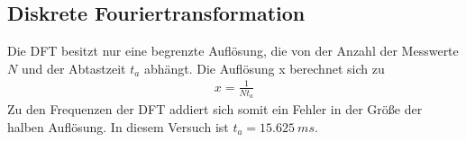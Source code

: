 \subsection{Diskrete Fouriertransformation}
Die DFT besitzt nur eine begrenzte Auflösung, die von der Anzahl der Messwerte $N$ und der Abtastzeit $t_a$ abhängt. Die Auflösung x berechnet sich zu
\begin{align}
x = \frac{1}{N t_a}
\end{align}
Zu den Frequenzen der DFT addiert sich somit ein Fehler in der Größe der halben Auflösung. In diesem Versuch ist $t_a = \SI{15,625}{ms}$.